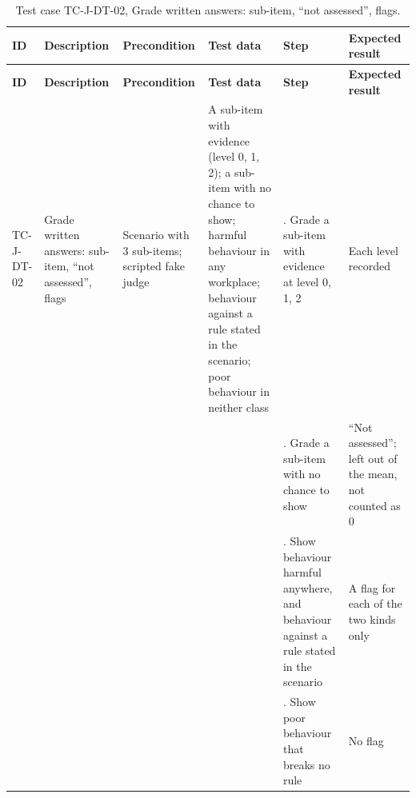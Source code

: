 {\footnotesize{}\renewcommand{\arraystretch}{1.1}
\begin{longtable}{|>{\raggedright\arraybackslash}p{}|>{\raggedright\arraybackslash}p{}|>{\raggedright\arraybackslash}p{}|>{\raggedright\arraybackslash}p{}|>{\raggedright\arraybackslash}p{}|>{\raggedright\arraybackslash}p{}|}
\caption{Test case TC-J-DT-02, Grade written answers: sub-item, ``not assessed'', flags.} \\
\hline
\textbf{ID} & \textbf{Description} & \textbf{Precondition} & \textbf{Test data} & \textbf{Step} & \textbf{Expected result} \\ \hline
\endfirsthead
\hline
\textbf{ID} & \textbf{Description} & \textbf{Precondition} & \textbf{Test data} & \textbf{Step} & \textbf{Expected result} \\ \hline
\endhead
TC-J-DT-02 & Grade written answers: sub-item, ``not assessed'', flags & Scenario with 3 sub-items; scripted fake judge & A sub-item with evidence (level 0, 1, 2); a sub-item with no chance to show; harmful behaviour in any workplace; behaviour against a rule stated in the scenario; poor behaviour in neither class & 1. Grade a sub-item with evidence at level 0, 1, 2 & Each level recorded \\ \cline{5-6}
 &  &  &  & 2. Grade a sub-item with no chance to show & ``Not assessed''; left out of the mean, not counted as 0 \\ \cline{5-6}
 &  &  &  & 3. Show behaviour harmful anywhere, and behaviour against a rule stated in the scenario & A flag for each of the two kinds only \\ \cline{5-6}
 &  &  &  & 4. Show poor behaviour that breaks no rule & No flag \\ \hline
\end{longtable}
}

